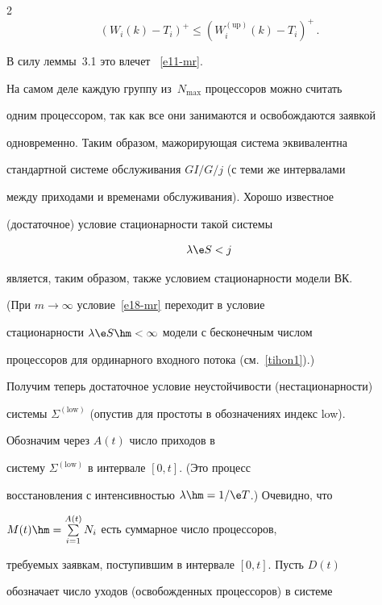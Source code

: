 \begin{multicols}{2}
\begin{equation*}
(W_{i}(k)-T_{i})^{+}\leqslant (W^{(\mathrm{up})}_{i}(k)-T_{i})^{+}\,.

\end{equation*}

В силу леммы~3.1 это влечет ~\eqref{e11-mr}.



\medskip



На самом деле каждую группу из~$N_{\max}$ процессоров можно считать

одним процессором, так как все они занимаются и освобождаются  заявкой

одновременно. Таким образом,  мажорирующая система эквивалентна

стандартной системе обслуживания $GI/G/j$ (с теми же интервалами

между приходами и  временами обслуживания). Хорошо известное

(достаточное) условие стационарности такой сис\-темы

\begin{equation}

\lambda \e S<j 

\label{e18-mr}

\end{equation}

является, таким образом, также  условием стационарности модели ВК.

(При $m\to\infty$ условие~\eqref{e18-mr} переходит в условие

стационарности $\lambda \e S\hm<\infty$ модели с бесконечным числом

процессоров для ординарного входного потока (см.\ \eqref{tihon1}).)



Получим теперь  достаточное условие неустойчивости (нестационарности)

 сис\-те\-мы $\Sigma^{(\mathrm{low})}$ (опус\-тив для простоты в обозначениях  индекс low).

 Обозначим через $A(t)$ число приходов в

систему $\Sigma^{(\mathrm{low})}$ в интервале $[0,t]$. (Это процесс

восстановления с интенсивностью $\lambda\hm=1/\e T$.) Очевидно, что

$M(t)\hm=\sum\limits_{i=1}^{A(t)}N_{i}$ есть суммарное число процессоров,

требуемых заявкам, поступившим  в интервале $[0,t]$. Пусть $D(t)$

обозначает число уходов (освобожденных процессоров) в сис\-те\-ме


\end{multicols}
